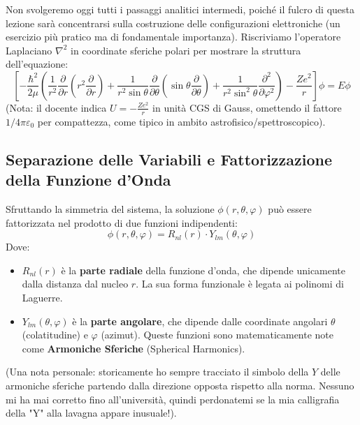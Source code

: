 Non svolgeremo oggi tutti i passaggi analitici intermedi, poiché il fulcro di questa lezione sarà concentrarsi sulla costruzione delle configurazioni elettroniche (un esercizio più pratico ma di fondamentale importanza). Riscriviamo l'operatore Laplaciano $\nabla^2$ in coordinate sferiche polari per mostrare la struttura dell'equazione:
\begin{equation}
\left[ -\frac{\hbar^2}{2\mu} \left( \frac{1}{r^2} \frac{\partial}{\partial r} \left( r^2 \frac{\partial}{\partial r} \right) + \frac{1}{r^2 \sin\theta} \frac{\partial}{\partial \theta} \left( \sin\theta \frac{\partial}{\partial \theta} \right) + \frac{1}{r^2 \sin^2\theta} \frac{\partial^2}{\partial \varphi^2} \right) - \frac{Ze^2}{r} \right] \phi = E \phi
\end{equation}
(Nota: il docente indica $U = -\frac{Ze^2}{r}$ in unità CGS di Gauss, omettendo il fattore $1/4\pi\varepsilon_0$ per compattezza, come tipico in ambito astrofisico/spettroscopico).

\subsection{Separazione delle Variabili e Fattorizzazione della Funzione d'Onda}

Sfruttando la simmetria del sistema, la soluzione $\phi(r, \theta, \varphi)$ può essere fattorizzata nel prodotto di due funzioni indipendenti:
\begin{equation}
\phi(r, \theta, \varphi) = R_{nl}(r) \cdot Y_{lm}(\theta, \varphi)
\end{equation}
Dove:
\begin{itemize}
\item $R_{nl}(r)$ è la \textbf{parte radiale} della funzione d'onda, che dipende unicamente dalla distanza dal nucleo $r$. La sua forma funzionale è legata ai polinomi di Laguerre.
\item $Y_{lm}(\theta, \varphi)$ è la \textbf{parte angolare}, che dipende dalle coordinate angolari $\theta$ (colatitudine) e $\varphi$ (azimut). Queste funzioni sono matematicamente note come \textbf{Armoniche Sferiche} (Spherical Harmonics).
\end{itemize}

(Una nota personale: storicamente ho sempre tracciato il simbolo della $Y$ delle armoniche sferiche partendo dalla direzione opposta rispetto alla norma. Nessuno mi ha mai corretto fino all'università, quindi perdonatemi se la mia calligrafia della "Y" alla lavagna appare inusuale!).

